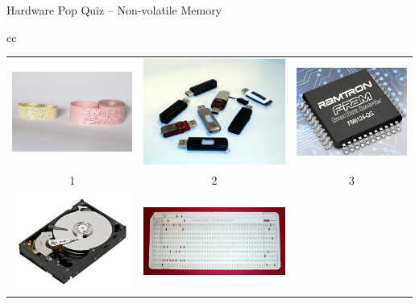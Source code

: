 \documentclass[compress,11pt,xcolor=svgnames,aspectratio=169]{beamer}
\begin{document}
\begin{frame}[fragile] {Hardware Pop Quiz -- Non-volatile Memory}
\begin{center}
\begin{tabular}{cc}
\begin{tabular}{ccc}
\includegraphics[scale=0.15]{fig/paper-tape} &
\includegraphics[scale=0.15]{fig/usb} &
\includegraphics[scale=0.15]{fig/fram} \\
1 & 2 & 3 \\
\includegraphics[scale=0.15]{fig/disk} &
\includegraphics[scale=0.15]{fig/punch-card} &

\end{tabular}
\end{tabular}
\end{center}
\end{frame}
\end{document}
